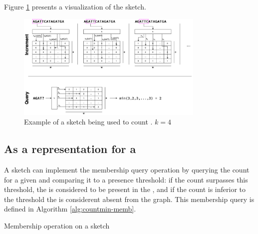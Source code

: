 

Figure \ref{fig:countminexample} presents a visualization of the \cm sketch.

\begin{figure}[htbp]
	\begin{center}
    \includegraphics[width=0.8\textwidth]{figures/cm-example}
	\end{center}
	\caption{Example of a \cm sketch being used to count \kmers. $k=4$}\label{fig:countminexample}
\end{figure}

\subsection{As a representation for a \dBG}


A \cm sketch can implement the membership query operation by querying the count for a given \kmer and comparing it to a presence threshold:
if the count surpasses this threshold, the \kmer is considered to be present in the \dBG, and if the count is inferior to the threshold the
\kmer is considerent absent from the graph. This membership query is defined in Algorithm \ref{alg:countmin-memb}.

\begin{algorithm}[htbp]
  \caption{Membership operation on a \cm sketch}\label{alg:countmin-memb}
\end{algorithm}

